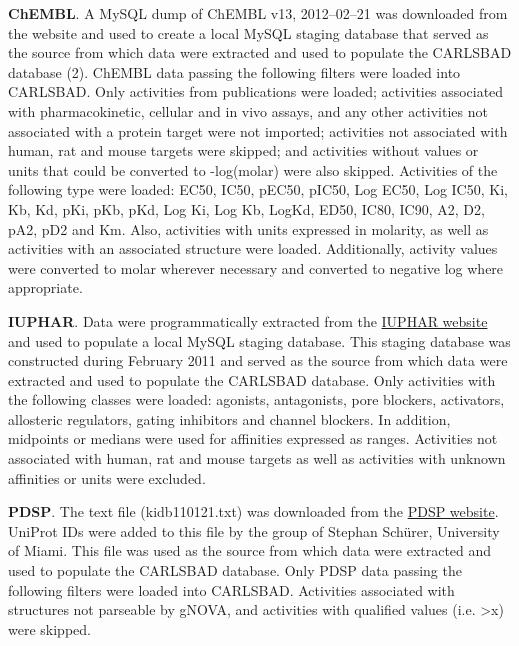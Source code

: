 \textbf{ChEMBL}. A MySQL dump of ChEMBL v13, 2012–02–21 was downloaded from the website and used to create a local MySQL staging database that served as the source from which data were extracted and used to populate the CARLSBAD database (2). ChEMBL data passing the following filters were loaded into CARLSBAD. Only activities from publications were loaded; activities associated with pharmacokinetic, cellular and in vivo assays, and any other activities not associated with a protein target were not imported; activities not associated with human, rat and mouse targets were skipped; and activities without values or units that could be converted to -log(molar) were also skipped. Activities of the following type were loaded: EC50, IC50, pEC50, pIC50, Log EC50, Log IC50, Ki, Kb, Kd, pKi, pKb, pKd, Log Ki, Log Kb, LogKd, ED50, IC80, IC90, A2, D2, pA2, pD2 and Km. Also, activities with units expressed in molarity, as well as activities with an associated structure were loaded. Additionally, activity values were converted to molar wherever necessary and converted to negative log where appropriate.

\textbf{IUPHAR}. Data were programmatically extracted from the \href{http://www.iuphar-db.org/}{IUPHAR website} and used to populate a local MySQL staging database. This staging database was constructed during February 2011 and served as the source from which data were extracted and used to populate the CARLSBAD database. Only activities with the following classes were loaded: agonists, antagonists, pore blockers, activators, allosteric regulators, gating inhibitors and channel blockers. In addition, midpoints or medians were used for affinities expressed as ranges. Activities not associated with human, rat and mouse targets as well as activities with unknown affinities or units were excluded.

\textbf{PDSP}. The text file (kidb110121.txt) was downloaded from the \href{http://pdsp.med.unc.edu/indexR.html}{PDSP website}. UniProt IDs were added to this file by the group of Stephan Sch\"{u}rer, University of Miami. This file was used as the source from which data were extracted and used to populate the CARLSBAD database. Only PDSP data passing the following filters were loaded into CARLSBAD. Activities associated with structures not parseable by gNOVA, and activities with qualified values (i.e. \textgreater x) were skipped.

